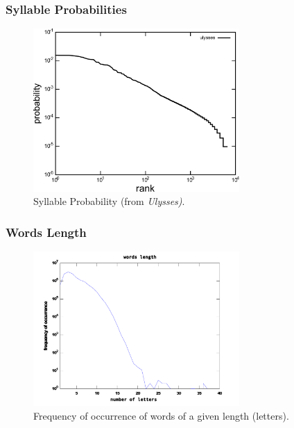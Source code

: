 \documentclass{beamer}
\begin{document}
\frame
{
  \frametitle{Syllable Probabilities}
  \begin{figure}[h!]
  \centering
  \includegraphics[width=0.7\textwidth]{imagespresentation/ulysses_syllables_probabilities.pdf}
  \caption{Syllable Probability (from \emph{Ulysses)}.}
  \label{fig:ulysses_syllables_probabilities}
  \end{figure} 
}




\frame
{
  \frametitle{Words Length}
\begin{figure}[h!]
\centering
\includegraphics[width=0.7\textwidth]{images/wordslength_en.pdf}
\caption{Frequency of occurrence of words of a given length (letters).}
\label{fig:wordslength_en}
\end{figure}   
}


\end{document}
